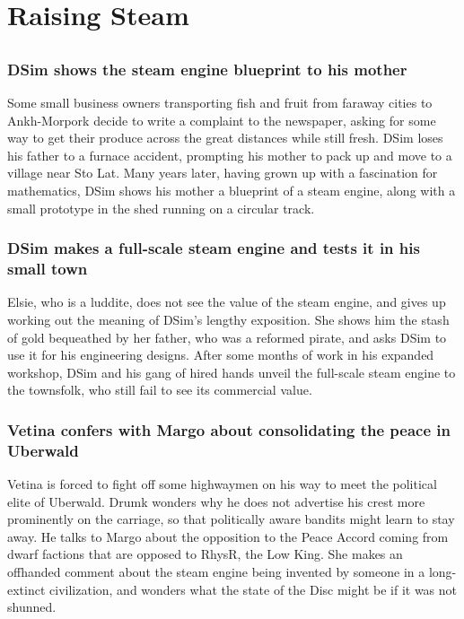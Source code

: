 \section{Raising Steam}


\subsection{}
\subsubsection{\Gls{DSim} shows the steam engine blueprint to his mother}
Some small business owners transporting fish and fruit from faraway cities to Ankh-Morpork decide to
write a complaint to the newspaper, asking for some way to get their produce across the great
distances while still fresh. \Gls{DSim} loses his father to a furnace accident, prompting his mother
to pack up and move to a village near Sto Lat. Many years later, having grown up with a fascination
for mathematics, \Gls{DSim} shows his mother a blueprint of a steam engine, along with a small
prototype in the shed running on a circular track.

\subsubsection{\Gls{DSim} makes a full-scale steam engine and tests it in his small town}
\Gls{Elsie}, who is a luddite, does not see the value of the steam engine, and gives up working out
the meaning of \Gls{DSim}'s lengthy exposition. She shows him the stash of gold bequeathed by her
father, who was a reformed pirate, and asks \Gls{DSim} to use it for his engineering designs. After
some months of work in his expanded workshop, \Gls{DSim} and his gang of hired hands unveil the
full-scale steam engine to the townsfolk, who still fail to see its commercial value.

\subsubsection{\Gls{Vetina} confers with \Gls{Margo} about consolidating the peace in Uberwald}
\Gls{Vetina} is forced to fight off some highwaymen on his way to meet the political elite of
Uberwald. \Gls{Drumk} wonders why he does not advertise his crest more prominently on the carriage,
so that politically aware bandits might learn to stay away. He talks to \Gls{Margo} about the
opposition to the Peace Accord coming from dwarf factions that are opposed to \Gls{RhysR}, the Low
King. She makes an offhanded comment about the steam engine being invented by someone in a
long-extinct civilization, and wonders what the state of the Disc might be if it was not shunned.

